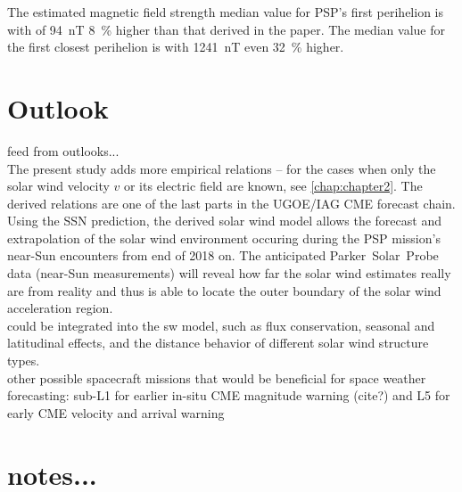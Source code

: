 The estimated magnetic field strength median value for PSP's first perihelion is with of \SI{94}{\nano\tesla} \SI{8}{\%} higher than that derived in the paper. The median value for the first closest perihelion is with \SI{1241}{\nano\tesla} even \SI{32}{\%} higher.\\


\section{Outlook}

feed from outlooks...\\

The present study adds more empirical \Kp{} relations -- for the cases when only the solar wind velocity $v$ or its electric field \vBz{} are known, see \autoref{chap:chapter2}. The derived \Kp{} relations are one of the last parts in the UGOE/IAG CME forecast chain.\\

Using the SSN prediction, the derived solar wind model allows the forecast and extrapolation of the solar wind environment occuring during the PSP mission's near-Sun encounters from end of 2018 on. The anticipated Parker~Solar~Probe data (near-Sun measurements) will reveal how far the solar wind estimates really are from reality and thus is able to locate the outer boundary of the solar wind acceleration region.\\

could be integrated into the sw model, such as flux conservation, seasonal and latitudinal effects, and the distance behavior of different solar wind structure types.\\

other possible spacecraft missions that would be beneficial for space weather forecasting: sub-L1 for earlier in-situ CME magnitude warning (cite?) and L5 for early CME velocity and arrival warning \citep{Vourlidas2015}\\




\section{notes...}

